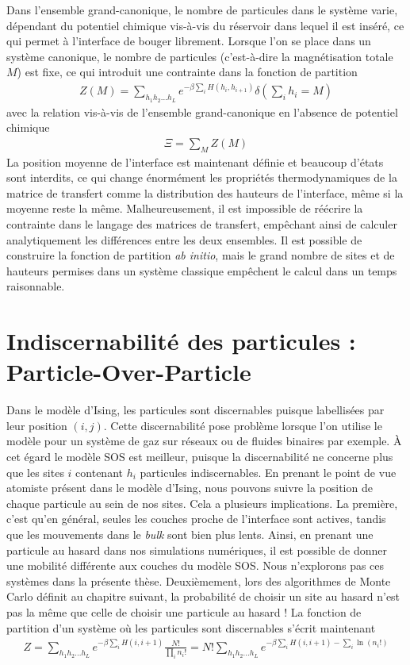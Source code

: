 Dans l'ensemble grand-canonique, le nombre de particules dans le système varie, dépendant du potentiel chimique vis-à-vis du réservoir dans lequel il est inséré, ce qui permet à l'interface de bouger librement. Lorsque l'on se place dans un système canonique, le nombre de particules (c'est-à-dire la magnétisation totale $M$) est fixe, ce qui introduit une contrainte dans la fonction de partition
\begin{align}
	 Z(M) = \sum_{h_1 h_2 ... h_L} e^{- \beta \sum_{i} H(h_i,h_{i+1})}  \delta(\sum_i h_i = M)
\end{align}
avec la relation vis-à-vis de l'ensemble grand-canonique en l'absence de potentiel chimique
\begin{align}
	 \Xi = \sum_{M} Z(M) 
\end{align}
La position moyenne de l'interface est maintenant définie et beaucoup d'états sont interdits, ce qui change énormément les propriétés thermodynamiques de la matrice de transfert comme la distribution des hauteurs de l'interface, même si la moyenne reste la même. Malheureusement, il est impossible de réécrire la contrainte dans le langage des matrices de transfert, empêchant ainsi de calculer analytiquement les différences entre les deux ensembles. Il est possible de construire la fonction de partition \textit{ab initio}, mais le grand nombre de sites et de hauteurs permises dans un système classique empêchent le calcul dans un temps raisonnable. 


	\section{Indiscernabilité des particules : Particle-Over-Particle}
	
Dans le modèle d'Ising, les particules sont discernables puisque labellisées par leur position $(i,j)$. Cette discernabilité pose problème lorsque l'on utilise le modèle pour un système de gaz sur réseaux ou de fluides binaires par exemple. À cet égard le modèle SOS est meilleur, puisque la discernabilité ne concerne plus que les sites $i$ contenant $h_i$ particules indiscernables. 
En prenant le point de vue atomiste présent dans le modèle d'Ising, nous pouvons suivre la position de chaque particule au sein de nos sites. Cela a plusieurs implications.
La première, c'est qu'en général, seules les couches proche de l'interface sont actives, tandis que les mouvements dans le \textit{bulk} sont bien plus lents. Ainsi, en prenant une particule au hasard dans nos simulations numériques, il est possible de donner une mobilité différente aux couches du modèle SOS. Nous n'explorons pas ces systèmes dans la présente thèse. 
Deuxièmement, lors des algorithmes de Monte Carlo définit au chapitre suivant, la probabilité de choisir un site au hasard n'est pas la même que celle de choisir une particule au hasard ! 
La fonction de partition d'un système où les particules sont discernables s'écrit maintenant
\begin{align}
	Z = \sum_{h_1 h_2 ... h_L} e^{- \beta \sum_{i} H(i,i+1)} \frac{N!}{\prod_i n_i!} = N! \sum_{h_1 h_2 ... h_L} e^{- \beta \sum_{i} H(i,i+1) -\sum_i \ln(n_i!)}
\end{align}

